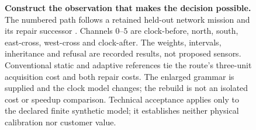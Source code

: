 \begin{figure}[!htbp]
\endgroup
\caption{\textbf{Construct the observation that makes the decision possible.}
The numbered path follows a retained held-out network mission and its repair successor \citep{compiler,run}.
Channels \(0\)--\(5\) are clock-before, north, south, east-cross, west-cross and clock-after.
The weights, intervals, inheritance and refusal are recorded results, not proposed sensors.
Conventional static and adaptive references tie the route's three-unit acquisition cost and both repair costs.
The enlarged grammar is supplied and the clock model changes; the rebuild is not an isolated cost or speedup comparison.
Technical acceptance applies only to the declared finite synthetic model; it establishes neither physical calibration nor customer value.}
\label{fig:transformation}
\end{figure}
